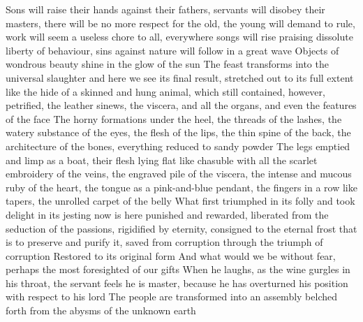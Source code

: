 \documentclass{article}
\begin{document}
Sons will raise their hands against their fathers, servants will disobey their masters, there will be no more respect for the old, the young will demand to rule, work will seem a useless chore to all, everywhere songs will rise praising dissolute liberty of behaviour, sins against nature will follow in a great wave
Objects of wondrous beauty shine in the glow of the sun
The feast transforms into the universal slaughter and here we see its final result, stretched out to its full extent like the hide of a skinned and hung animal, which still contained, however, petrified, the leather sinews, the viscera, and all the organs, and even the features of the face
The horny formations under the heel, the threads of the lashes, the watery substance of the eyes, the flesh of the lips, the thin spine of the back, the architecture of the bones, everything reduced to sandy powder
The legs emptied and limp as a boat, their flesh lying flat like chasuble with all the scarlet embroidery of the veins, the engraved pile of the viscera, the intense and mucous ruby of the heart, the tongue as a pink-and-blue pendant, the fingers in a row like tapers, the unrolled carpet of the belly
What first triumphed in its folly and took delight in its jesting now is here punished and rewarded, liberated from the seduction of the passions, rigidified by eternity, consigned to the eternal frost that is to preserve and purify it, saved from corruption through the triumph of corruption
Restored to its original form
And what would we be without fear, perhaps the most foresighted of our gifts
When he laughs, as the wine gurgles in his throat, the servant feels he is master, because he has overturned his position with respect to his lord
The people are transformed into an assembly belched forth from the abysms of the unknown earth
\fi
\end{document}
